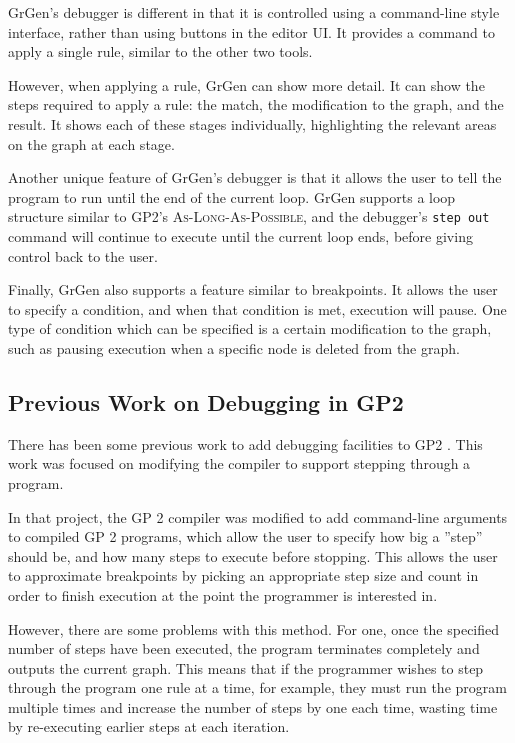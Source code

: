 \documentclass[authoryearcitations]{UoYCSproject}
\begin{document}
GrGen's debugger is different in that it is controlled using a command-line style
interface, rather than using buttons in the editor UI. It provides a command to
apply a single rule, similar to the other two tools.

However, when applying a rule, GrGen can show more detail. It can show the steps
required to apply a rule: the match, the modification to the graph, and the result.
It shows each of these stages individually, highlighting the relevant areas on the
graph at each stage.

Another unique feature of GrGen's debugger is that it allows the user to tell the
program to run until the end of the current loop. GrGen supports a loop structure
similar to GP2's \textsc{As-Long-As-Possible}, and the debugger's \texttt{step out}
command will continue to execute until the current loop ends, before giving control
back to the user.

Finally, GrGen also supports a feature similar to breakpoints. It allows the user
to specify a condition, and when that condition is met, execution will pause. One
type of condition which can be specified is a certain modification to the graph,
such as pausing execution when a specific node is deleted from the graph.


\subsection{Previous Work on Debugging in GP2}
\label{sec:PreviousWorkOnDebuggingInGP2}

There has been some previous work to add debugging facilities to GP2 \citep{taylor2016}.
This work was focused on modifying the compiler to support stepping through a
program.

In that project, the GP 2 compiler was modified to add command-line arguments to
compiled GP 2 programs, which allow the user to specify how big a ''step'' should be,
and how many steps to execute before stopping. This allows the user to approximate
breakpoints by picking an appropriate step size and count in order to finish execution
at the point the programmer is interested in.

However, there are some problems with this method. For one, once the specified
number of steps have been executed, the program terminates completely and outputs
the current graph. This means that if the programmer wishes to step through the
program one rule at a time, for example, they must run the program multiple times
and increase the number of steps by one each time, wasting time by re-executing
earlier steps at each iteration.
\end{document}
